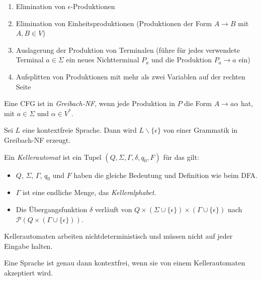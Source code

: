 \documentclass{cheat-sheet}
\begin{document}
\begin{enumerate}
  \item Elimination von $\epsilon$-Produktionen
  \item Elimination von Einheitsproduktionen (Produktionen der Form $A \longrightarrow B$ mit $A, B \in V$)
  \item Auslagerung der Produktion von Terminalen (führe für jedes verwendete Terminal $a \in \Sigma$ ein neues Nichtterminal $P_{a}$ und die Produktion $P_{a} \longrightarrow a$ ein)
  \item Aufsplitten von Produktionen mit mehr als zwei Variablen auf der rechten Seite
\end{enumerate}


\begin{definition}
Eine CFG ist in \emph{Greibach-NF}, wenn jede Produktion in $P$ die Form $A \longrightarrow a \alpha$ hat, mit $a \in \Sigma$ und $\alpha \in V^{*}$.
\end{definition}

\begin{satz}
Sei $L$ eine kontextfreie Sprache. Dann wird $L \backslash \{ \epsilon \}$ von einer Grammatik in Greibach-NF erzeugt.
\end{satz}

\begin{definition}
Ein \emph{Kellerautomat} ist ein Tupel $(Q, \Sigma, \Gamma, \delta, q_{0}, F)$ für das gilt:

\begin{itemize}
  \item $Q$, $\Sigma$, $\Gamma$, $q_{0}$ und $F$ haben die gleiche Bedeutung und Definition wie beim DFA.
  \item $\Gamma$ ist eine endliche Menge, das \emph{Kelleralphabet}.
  \item Die Übergangsfunktion $\delta$ verläuft von $Q \times (\Sigma \cup \{ \epsilon \}) \times (\Gamma \cup \{ \epsilon \})$ nach $\mathcal{P}(Q \times (\Gamma \cup \{ \epsilon \}))$.
\end{itemize}
\end{definition}

\begin{bem}
Kellerautomaten arbeiten nichtdeterministisch und müssen nicht auf jeder Eingabe halten.
\end{bem}


\begin{satz}
Eine Sprache ist genau dann kontextfrei, wenn sie von einem Kellerautomaten akzeptiert wird.
\end{satz}
\end{document}
